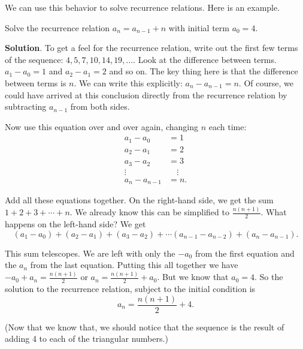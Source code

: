 \documentclass[11pt,]{book}
\theoremstyle{ptxplainnotitle}
\theoremstyle{ptxplaintitle}
\theoremstyle{ptxdefinitionnotitle}
\theoremstyle{ptxdefinitiontitle}
\theoremstyle{ptxdefinitionnotitle}
\theoremstyle{ptxdefinitiontitle}
\theoremstyle{ptxdefinitionnotitle}
\theoremstyle{ptxdefinitiontitle}
\theoremstyle{ptxdefinitiontitlenonumber}
\theoremstyle{ptxdefinitiontitlenonumber}
\numberwithin{equation}{chapter}
\newcommand{\amp}{&}
\begin{document}
We can use this behavior to solve recurrence relations. Here is an example.%
\begin{example}\label{example-20}
\hypertarget{p-430}{}%
Solve the recurrence relation \(a_n = a_{n-1} + n\) with initial term \(a_0 = 4\).%
\par\smallskip%
\noindent\textbf{Solution}.\hypertarget{solution-59}{}\quad%
\hypertarget{p-431}{}%
To get a feel for the recurrence relation, write out the first few terms of the sequence: \(4, 5, 7, 10, 14, 19, \ldots\). Look at the difference between terms. \(a_1 - a_0 = 1\) and \(a_2 - a_1 = 2\) and so on. The key thing here is that the difference between terms is \(n\). We can write this explicitly: \(a_n - a_{n-1} = n\). Of course, we could have arrived at this conclusion directly from the recurrence relation by subtracting \(a_{n-1}\) from both sides.%
\par
\hypertarget{p-432}{}%
Now use this equation over and over again, changing \(n\) each time:%
\begin{align*}
a_1 - a_0 \amp = 1\\
a_2 - a_1 \amp = 2\\
a_3 - a_2 \amp = 3\\
\vdots \quad \amp \quad \vdots\\
a_n - a_{n-1} \amp = n.
\end{align*}
%
\par
\hypertarget{p-433}{}%
Add all these equations together. On the right-hand side, we get the sum \(1 + 2 + 3 + \cdots + n\). We already know this can be simplified to \(\frac{n(n+1)}{2}\). What happens on the left-hand side? We get%
\begin{equation*}
(a_1 - a_0) + (a_2 - a_1) + (a_3 - a_2) + \cdots (a_{n-1} - a_{n-2})+ (a_n - a_{n-1}).
\end{equation*}
%
\par
\hypertarget{p-434}{}%
This sum telescopes. We are left with only the \(-a_0\) from the first equation and the \(a_n\) from the last equation. Putting this all together we have \(-a_0 + a_n = \frac{n(n+1)}{2}\) or \(a_n = \frac{n(n+1)}{2} + a_0\). But we know that \(a_0 = 4\). So the solution to the recurrence relation, subject to the initial condition is%
\begin{equation*}
a_n = \frac{n(n+1)}{2} + 4.
\end{equation*}
%
\par
\hypertarget{p-435}{}%
(Now that we know that, we should notice that the sequence is the result of adding 4 to each of the triangular numbers.)%
\end{example}
\end{document}
